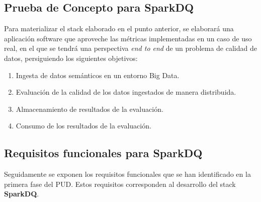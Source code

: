 \subsection{Prueba de Concepto para SparkDQ}

Para materializar el stack elaborado en el punto anterior, se elaborará una
aplicación software que aproveche las métricas implementadas en un caso de uso
real, en el que se tendrá una perspectiva \textit{end to end} de un problema de
calidad de datos, persiguiendo los siguientes objetivos:

\begin{enumerate}
\item Ingesta de datos semánticos en un entorno Big Data.
\item Evaluación de la calidad de los datos ingestados de manera distribuida. 
\item Almacenamiento de resultados de la evaluación.
\item Consumo de los resultados de la evaluación. 
\end{enumerate}

\subsection{Requisitos funcionales para SparkDQ}

Seguidamente se exponen los requisitos funcionales que se han identificado en la
primera fase del \acs{PUD}. Estos requisitos corresponden al desarrollo del
stack \textbf{SparkDQ}.

